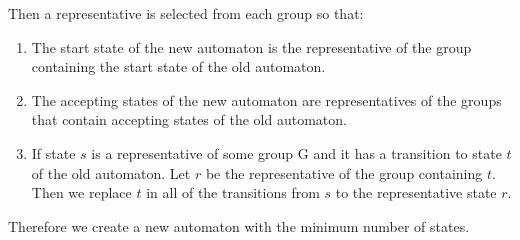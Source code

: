 \documentclass{article}
\begin{document}
Then a representative is selected from each group so that:
\begin{enumerate}
  \item The start state of the new automaton is the representative of the
        group containing the start state of the old automaton.
  \item The accepting states of the new automaton are representatives of
        the groups that contain accepting states of the old automaton.
  \item If state $s$ is a representative of some group G and it has a
        transition to state $t$ of the old automaton. Let $r$ be the
        representative of the group containing $t$. Then we replace $t$ in all
        of the transitions from $s$ to the representative state $r$.
\end{enumerate}
Therefore we create a new automaton with the minimum number of states.
\end{document}
